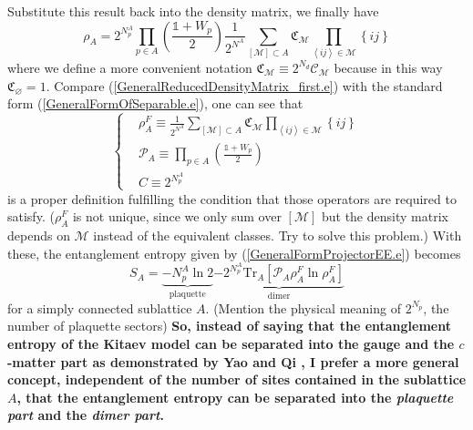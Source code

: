 \documentclass[12font]{article}
\theoremstyle{definition}
\numberwithin{equation}{section}
\newcommand{\anglelr}[1]{\left\langle #1 \right\rangle}
\newcommand{\lr}[1]{\left(  #1  \right)}
\newcommand{\lrm}[1]{\left[  #1  \right]}
\newcommand{\lrg}[1]{\left\{  #1  \right\}}
\newcommand{\mrm}[1]{\mathrm{#1}}
\newcommand{\alert}[1]{{\color{red}#1}}
\newcommand{\alertV}[1]{{\color{violet}#1}}
\newcommand{\Tr}{\mrm{Tr}}
\begin{document}
Substitute this result back into the density matrix, we finally have
\begin{equation}\label{GeneralReducedDensityMatrix_first.e}
  \rho_A = 2^{N_p^A}\prod_{p\in A}\lr{\frac{\mathds{1}+W_p}{2}}\frac{1}{2^{N^A}}\sum_{[\mathcal{M}]\subset A}\mathfrak{C}_\mathcal{M}\prod_{\anglelr{ij}\in\mathcal{M}}\lrg{ij}
\end{equation}
where we define a more convenient notation $\mathfrak{C}_{\mathcal{M}} \equiv 2^{N_d}\mathcal{C}_{\mathcal{M}}$ because in this way $\mathfrak{C}_\varnothing = 1$. Compare (\ref{GeneralReducedDensityMatrix_first.e}) with the standard form (\ref{GeneralFormOfSeparable.e}), one can see that 
\[\left\{
\begin{aligned}
& \rho_A^F \equiv \frac{1}{2^{N^A}}\sum_{[\mathcal{M}]\subset A}\mathfrak{C}_\mathcal{M}\prod_{\anglelr{ij}\in\mathcal{M}}\lrg{ij}\\
& \mathcal{P}_A \equiv \prod_{p\in A}\lr{\frac{\mathds{1}+W_p}{2}} \\
& C \equiv 2^{N_p^A}
\end{aligned}
\right.
\]
is a proper definition fulfilling the condition that those operators are required to satisfy. \alert{($\rho_A^F$ is not unique, since we only sum over $[\mathcal{M}]$ but the density matrix depends on $\mathcal{M}$ instead of the equivalent classes. Try to solve this problem.)} With these, the entanglement entropy given by (\ref{GeneralFormProjectorEE.e}) becomes
\begin{equation}\label{SeparateGood_Plaquette-and-Dimer.e}
  S_{A} = \underbrace{-N_p^A\ln 2}_{\text{plaquette}} \underbrace{-2^{N_p^A}\Tr_A\lrm{\mathcal{P}_A\rho_A^F\ln\rho_A^F}}_{\text{dimer}}
\end{equation}
for a simply connected sublattice $A$. \alert{(Mention the physical meaning of $2^{N_p}$, the number of plaquette sectors)} \alertV{\textbf{So, instead of saying that the entanglement entropy of the Kitaev model can be separated into the gauge and the $c$-matter part as demonstrated by Yao and Qi \cite{Qi}, I prefer a more general concept, independent of the number of sites contained in the sublattice $A$, that the entanglement entropy can be separated into the \emph{plaquette part} and the \emph{dimer part}.}}
\end{document}

